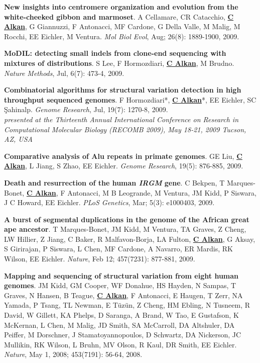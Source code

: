 \vspace{-.2cm}
{\bf  New insights into centromere organization and evolution from the white-cheeked gibbon and marmoset}.
A Cellamare,    CR Catacchio,  {\bf \underline{C Alkan}}, G Giannuzzi, F Antonacci, MF Cardone, G Della Valle, M Malig, M Rocchi, EE Eichler, M Ventura.
{\em Mol Biol Evol}, Aug; 26(8): 1889-1900, 2009.

\vspace{-.2cm}
{\bf MoDIL: detecting small indels from clone-end sequencing with mixtures of distributions}.
S Lee, F Hormozdiari, {\bf {\underline{C Alkan}}}, M Brudno.
{\em Nature Methods},  Jul, 6(7): 473-4, 2009.

\clearpage
\vspace{-.2cm}
{\bf  Combinatorial algorithms for structural variation detection in high throughput sequenced genomes}.
F Hormozdiari*, {\bf {\underline{C Alkan}}}*, EE Eichler, SC \c{S}ahinalp. 
{\em Genome Research}, Jul, 19(7): 1270-8, 2009.\\
\hspace*{1cm} {\footnotesize {\it presented at the
 Thirteenth Annual International Conference on Research in Computational Molecular 
Biology (RECOMB 2009), May 18-21, 2009 Tucson, AZ, USA}}



\vspace{-.2cm}

{\bf Comparative analysis of Alu repeats in primate genomes}.  GE Liu, {\bf {\underline{C Alkan}}}, L Jiang, S Zhao, EE Eichler. 
{\em Genome Research}, 19(5): 876-885, 2009.




\vspace{-.2cm}
{\bf Death and resurrection of the human {\em IRGM} gene}. C Bekpen, T Marques-Bonet,
{\bf {\underline{C Alkan}}}, F Antonacci, M B Leogrande, M Ventura, JM Kidd, P Siswara, J C Howard, EE Eichler. {\em PLoS Genetics}, Mar; 5(3): e1000403, 2009.

\vspace{-.2cm}

{\bf A burst of segmental duplications in the genome of the African great ape ancestor}. T Marques-Bonet, JM Kidd, M Ventura, TA Graves, Z Cheng, LW Hillier, Z Jiang, 
C Baker, R Malfavon-Borja, LA Fulton, {\bf {\underline{C Alkan}}}, G Aksay, S Girirajan,
 P Siswara, L Chen, MF Cardone, A Navarro, ER Mardis,
 RK Wilson, EE Eichler. {\em Nature}, Feb 12; 457(7231): 877-881, 2009.


\vspace{-.2cm}
 {\bf Mapping and sequencing of structural variation from eight human genomes}.
 JM Kidd, GM Cooper, WF Donahue, HS Hayden, 
 N Sampas, T Graves, N Hansen, B Teague, {\bf {\underline{C Alkan}}},  F Antonacci, 
 E Haugen, T Zerr, NA Yamada, P Tsang,  TL Newman, E T\"{u}z\"{u}n, 
 Z Cheng, HM Ebling, N Tusneem, R David, W Gillett, KA Phelps, 
 D Saranga, A Brand, W Tao, E Gustafson, K McKernan, L Chen, 
 M Malig, JD Smith, SA McCarroll, DA Altshuler,  
 DA Peiffer, M Dorschner, J Stamatoyannopoulos, D Schwartz,  
 DA Nickerson, JC Mullikin, RK Wilson, L Bruhn, 
 MV Olson, R Kaul, DR Smith, EE Eichler.
 {\em Nature}, May 1, 2008; 453(7191): 56-64, 2008.


